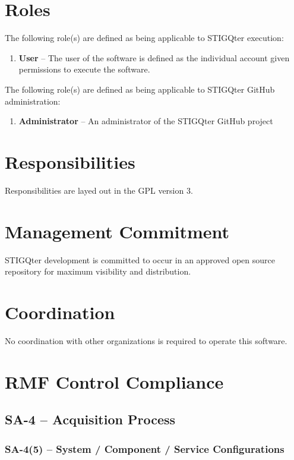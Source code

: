 \documentclass[letterpaper, 10pt, twoside]{article}
\begin{document}
\section{Roles}
\label{sec:roles}

The following role(s) are defined as being applicable to STIGQter execution:
\begin{enumerate}
	\item \textbf{User} -- The user of the software is defined as the individual account given permissions to execute the software.
\end{enumerate}

The following role(s) are defined as being applicable to STIGQter GitHub administration:
\begin{enumerate}
	\item \textbf{Administrator} -- An administrator of the STIGQter GitHub project
\end{enumerate}

\section{Responsibilities}
\label{sec:responsibilities}

Responsibilities are layed out in the GPL version 3.

\section{Management Commitment}

STIGQter development is committed to occur in an approved open source repository for maximum visibility and distribution.

\section{Coordination}

No coordination with other organizations is required to operate this software.

\section{RMF Control Compliance}

\subsection{SA-4 -- Acquisition Process}

\subsubsection{SA-4(5) -- System / Component / Service Configurations}
\end{document}
